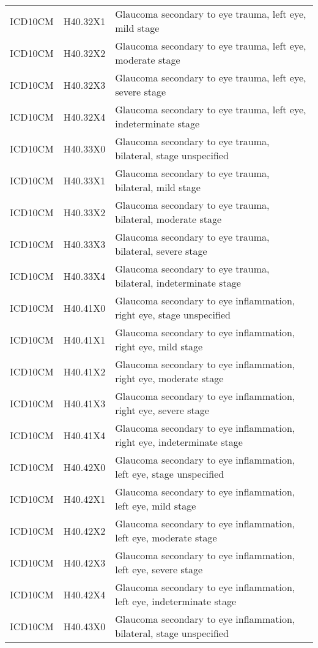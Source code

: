 \begin{longtable}{p{}p{}p{}}
  ICD10CM & H40.32X1 & Glaucoma secondary to eye trauma, left eye, mild stage \\ 
  ICD10CM & H40.32X2 & Glaucoma secondary to eye trauma, left eye, moderate stage \\ 
  ICD10CM & H40.32X3 & Glaucoma secondary to eye trauma, left eye, severe stage \\ 
  ICD10CM & H40.32X4 & Glaucoma secondary to eye trauma, left eye, indeterminate stage \\ 
  ICD10CM & H40.33X0 & Glaucoma secondary to eye trauma, bilateral, stage unspecified \\ 
  ICD10CM & H40.33X1 & Glaucoma secondary to eye trauma, bilateral, mild stage \\ 
  ICD10CM & H40.33X2 & Glaucoma secondary to eye trauma, bilateral, moderate stage \\ 
  ICD10CM & H40.33X3 & Glaucoma secondary to eye trauma, bilateral, severe stage \\ 
  ICD10CM & H40.33X4 & Glaucoma secondary to eye trauma, bilateral, indeterminate stage \\ 
  ICD10CM & H40.41X0 & Glaucoma secondary to eye inflammation, right eye, stage unspecified \\ 
  ICD10CM & H40.41X1 & Glaucoma secondary to eye inflammation, right eye, mild stage \\ 
  ICD10CM & H40.41X2 & Glaucoma secondary to eye inflammation, right eye, moderate stage \\ 
  ICD10CM & H40.41X3 & Glaucoma secondary to eye inflammation, right eye, severe stage \\ 
  ICD10CM & H40.41X4 & Glaucoma secondary to eye inflammation, right eye, indeterminate stage \\ 
  ICD10CM & H40.42X0 & Glaucoma secondary to eye inflammation, left eye, stage unspecified \\ 
  ICD10CM & H40.42X1 & Glaucoma secondary to eye inflammation, left eye, mild stage \\ 
  ICD10CM & H40.42X2 & Glaucoma secondary to eye inflammation, left eye, moderate stage \\ 
  ICD10CM & H40.42X3 & Glaucoma secondary to eye inflammation, left eye, severe stage \\ 
  ICD10CM & H40.42X4 & Glaucoma secondary to eye inflammation, left eye, indeterminate stage \\ 
  ICD10CM & H40.43X0 & Glaucoma secondary to eye inflammation, bilateral, stage unspecified \\ 

\end{longtable}
